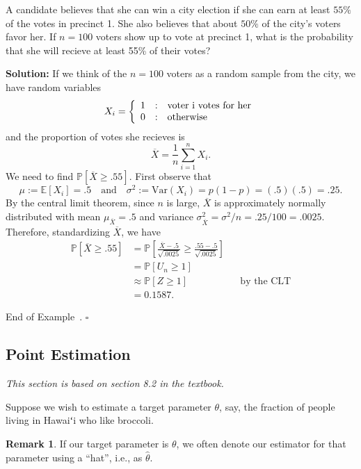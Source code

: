 \documentclass[10pt]{article}
\newcommand{\okina}{{\OkinaFallback ʻ}} %
\theoremstyle{definition}
\newtheorem{remark}[theorem]{Remark}
\newtheorem{example}[theorem]{Example}
\renewenvironment{example}
{\begin{oldexample}}
  {\par\smallskip\hfill   End of Example~\theexample. $\square$    \par\end{oldexample}}
\newcommand{\fl}{\noindent\textbf} %
\newcommand{\1}[1]{\textbf{1}_{\left[#1\right]}} %
\def\E{\mathbb{E}} %
\def\P{\mathbb{P}} %
\def\Var{\mathrm{Var}} %
\begin{document}
\begin{example}[Example 7.10 in the textbook]
  A candidate believes that she can win a city election if she can earn at
  least $55\%$ of the votes in precinct 1. She also believes that about $50\%$
  of the city's voters favor her. If $n=100$ voters show up to vote at precinct
  1, what is the probability that she will recieve at least 55\% of their
  votes?

  \fl{Solution:} If we think of the $n=100$ voters as a random sample from the
  city, we have random variables
  \begin{equation*}
    X_{i} = \left\{ \begin{array}{l@{\quad:\quad}l} 1 & \text{voter i votes for her}\\0 & \text{otherwise} \end{array}\right.
  \end{equation*}
  and the proportion of votes she recieves is
  \begin{equation*}
    \overline{X} = \frac{1}{n}\sum_{i=1}^{n}X_{i}.
  \end{equation*}
  We need to find $\P\left[\overline{X} \geq .55\right]$. First observe that
  \begin{equation*}
    \mu:= \E\left[X_{i} \right]=.5 \quad \text{and} \quad  \sigma^{2}:= \Var(X_{i}) = p(1-p) = (.5)(.5)=.25.
  \end{equation*}
  By the central limit theorem, since $n$ is large, $\overline{X}$ is
  approximately normally distributed with mean $\mu_{\overline{X}}=.5$ and
  variance $\sigma^{2}_{\overline{X}}=\sigma^{2}/n = .25/100=.0025$.
  Therefore, standardizing $\overline{X}$, we have
  \begin{align*}
    \P\left[\overline{X}\geq .55\right] 
    &= \P\left[\frac{\overline{X}-.5}{\sqrt{.0025}}\geq \frac{.55-.5}{\sqrt{.0025}}\right]\\
    &= \P\left[U_{n} \geq 1\right]\\
    &\approx \P\left[Z \geq 1\right] &&\text{by the CLT} \\
    &=0.1587.
  \end{align*}
\end{example}

\subsection{Point Estimation}
\textit{This section is based on section 8.2 in the textbook.}

Suppose we wish to estimate a target parameter $\theta$, say, the fraction of
people living in Hawai{\okina}i who like broccoli.
\begin{remark}
  If our target parameter is $\theta$, we often denote our estimator for that
  parameter using a ``hat'', i.e., as $\widehat{\theta}$.
\end{remark}
\end{document}
